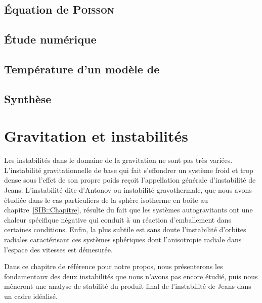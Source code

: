 	\section{Équation de \textsc{Poisson}}
		

	\section{Étude numérique}
		


	\section{Température d'un modèle de \King \label{sec::temp}}
		

	\section{Synthèse}
		


\chapter{Gravitation et instabilités}\label{Chap::Instabilite}
	\minitoc

	Les instabilités dans le domaine de la gravitation ne sont pas très variées. L'instabilité gravitationnelle de base qui fait s'effondrer un
	système froid et trop dense sous l'effet de son propre poids reçoit l'appellation générale d'instabilité de Jeans. L'instabilité dite
	d'Antonov ou instabilité gravothermale, que nous avons étudiée dans le cas particuliers de la sphère isotherme en boite au
	chapitre~\ref{SIB::Chapitre}, résulte du fait que les systèmes autogravitants ont une chaleur spécifique négative qui conduit à un réaction
	d'emballement dans certaines conditions. Enfin, la plus subtile est sans doute l'instabilité d'orbites radiales caractérisant ces systèmes
	sphériques dont l'anisotropie radiale dans l'espace des vitesses est démesurée.

	Dans ce chapitre de référence pour notre propos, nous présenterons les fondamentaux des deux instabilités que nous n'avons pas encore étudié,
	puis nous mèneront une analyse de stabilité du produit final de l'instabilité de Jeans dans un cadre idéalisé.

